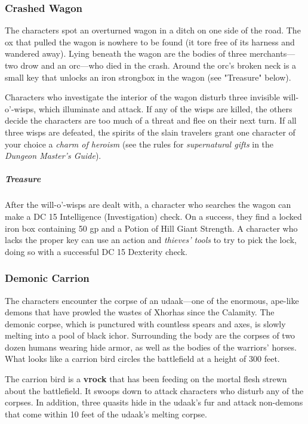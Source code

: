 \documentclass[10pt,a4paper,twoside,fancy,bg=print,twocolumn,openany,nodeprecatedcode]{dndbook}
\begin{document}
\subsubsection{Crashed Wagon}
The characters spot an overturned wagon in a ditch on one side of the road. The ox that pulled the wagon is nowhere to be found (it tore free of its harness and wandered away). Lying beneath the wagon are the bodies of three merchants—two drow and an orc—who died in the crash. Around the orc's broken neck is a small key that unlocks an iron strongbox in the wagon (see "Treasure" below).

Characters who investigate the interior of the wagon disturb three invisible will-o'-wisps, which illuminate and attack. If any of the wisps are killed, the others decide the characters are too much of a threat and flee on their next turn. If all three wisps are defeated, the spirits of the slain travelers grant one character of your choice a \textit{charm of heroism} (see the rules for \textit{supernatural gifts} in the \textit{Dungeon Master's Guide}).

\subparagraph{Treasure}
After the will-o'-wisps are dealt with, a character who searches the wagon can make a DC 15 Intelligence (Investigation) check. On a success, they find a locked iron box containing 50 gp and a Potion of Hill Giant Strength. A character who lacks the proper key can use an action and \textit{thieves' tools} to try to pick the lock, doing so with a successful DC 15 Dexterity check.

\subsubsection{Demonic Carrion}
The characters encounter the corpse of an udaak—one of the enormous, ape-like demons that have prowled the wastes of Xhorhas since the Calamity. The demonic corpse, which is punctured with countless spears and axes, is slowly melting into a pool of black ichor. Surrounding the body are the corpses of two dozen humans wearing hide armor, as well as the bodies of the warriors' horses. What looks like a carrion bird circles the battlefield at a height of 300 feet.

The carrion bird is a \textbf{vrock} that has been feeding on the mortal flesh strewn about the battlefield. It swoops down to attack characters who disturb any of the corpses. In addition, three quasits hide in the udaak's fur and attack non-demons that come within 10 feet of the udaak's melting corpse.
\end{document}
